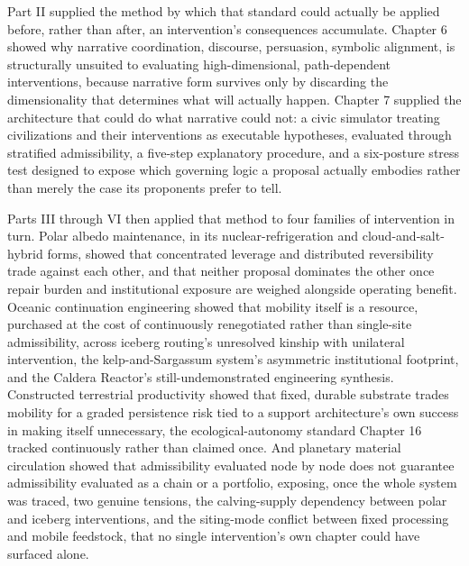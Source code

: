\documentclass[11pt,oneside]{book}
\begin{document}
Part II supplied the method by which that standard could actually be applied before, rather than after, an intervention's consequences accumulate. Chapter 6 showed why narrative coordination, discourse, persuasion, symbolic alignment, is structurally unsuited to evaluating high-dimensional, path-dependent interventions, because narrative form survives only by discarding the dimensionality that determines what will actually happen. Chapter 7 supplied the architecture that could do what narrative could not: a civic simulator treating civilizations and their interventions as executable hypotheses, evaluated through stratified admissibility, a five-step explanatory procedure, and a six-posture stress test designed to expose which governing logic a proposal actually embodies rather than merely the case its proponents prefer to tell.

Parts III through VI then applied that method to four families of intervention in turn. Polar albedo maintenance, in its nuclear-refrigeration and cloud-and-salt-hybrid forms, showed that concentrated leverage and distributed reversibility trade against each other, and that neither proposal dominates the other once repair burden and institutional exposure are weighed alongside operating benefit. Oceanic continuation engineering showed that mobility itself is a resource, purchased at the cost of continuously renegotiated rather than single-site admissibility, across iceberg routing's unresolved kinship with unilateral intervention, the kelp-and-Sargassum system's asymmetric institutional footprint, and the Caldera Reactor's still-undemonstrated engineering synthesis. Constructed terrestrial productivity showed that fixed, durable substrate trades mobility for a graded persistence risk tied to a support architecture's own success in making itself unnecessary, the ecological-autonomy standard Chapter 16 tracked continuously rather than claimed once. And planetary material circulation showed that admissibility evaluated node by node does not guarantee admissibility evaluated as a chain or a portfolio, exposing, once the whole system was traced, two genuine tensions, the calving-supply dependency between polar and iceberg interventions, and the siting-mode conflict between fixed processing and mobile feedstock, that no single intervention's own chapter could have surfaced alone.
\end{document}
